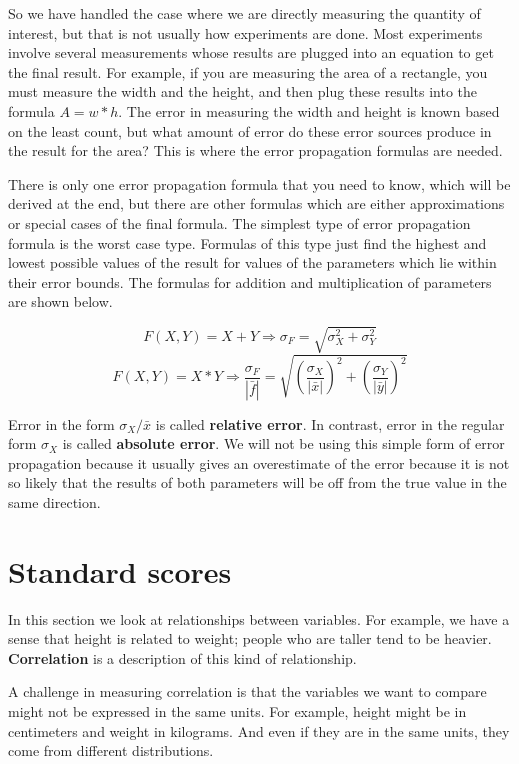 So we have handled the case where we are directly measuring the quantity of interest, but that is not usually how experiments are done. Most experiments involve several measurements whose results are plugged into an equation to get the final result. For example, if you are measuring the area of a rectangle, you must measure the width and the height, and then plug these results into the formula $A = w*h$. The error in measuring the width and height is known based on the least count, but what amount of error do these error sources produce in the result for the area? This is where the error propagation formulas are needed.

There is only one error propagation formula that you need to know, which will be derived at the end, but there are other formulas which are either approximations or special cases of the final formula. The simplest type of error propagation formula is the worst case type. Formulas of this type just find the highest and lowest possible values of the result for values of the parameters which lie within their error bounds. The formulas for addition and multiplication of parameters are shown below.

\[ F(X,Y) = X + Y \Rightarrow \sigma_F = \sqrt{\sigma^2_X + \sigma^2_Y} \]
\[ F(X,Y) = X*Y \Rightarrow \frac{\sigma_F}{|\bar{f}|} =\sqrt{ \left(\frac{\sigma_X}{|\bar{x}|}\right)^2 + \left(\frac{\sigma_Y}{|\bar{y}|}\right)^2} \]

Error in the form $\sigma_X/\bar{x}$ is called {\bf relative error}. In contrast, error in the regular form $\sigma_X$ is called {\bf absolute error}.
We will not be using this simple form of error propagation because it usually gives an overestimate of the error because it is not so likely that the results of both parameters will be off from the true value in the same direction.



\section{Standard scores}

In this section we look at relationships between variables.  For
example, we have a sense that height is related to weight; people who
are taller tend to be heavier.  {\bf Correlation} is a description of
this kind of relationship.

A challenge in measuring correlation is that the variables we want
to compare might not be expressed in the same units.  For example, height
might be in centimeters and weight in kilograms.  And even if they are
in the same units, they come from different distributions.



